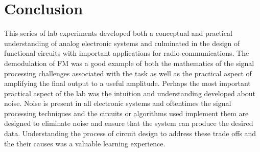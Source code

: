 \documentclass[11pt]{article}
\begin{document}
\section{Conclusion}
  This series of lab experiments developed both a conceptual and practical understanding of analog electronic systems and culminated in the design of functional circuits with important applications for radio communications. The demodulation of FM was a good example of both the mathematics of the signal processing challenges associated with the task as well as the practical aspect of amplifying the final output to a useful amplitude. Perhaps the most important practical aspect of the lab was the intuition and understanding developed about noise. Noise is present in all electronic systems and oftentimes the signal processing techniques and the circuits or algorithms used implement them are designed to eliminate noise and ensure that the system can produce the desired data. Understanding the process of circuit design to address these trade offs and the their causes was a valuable learning experience.
\end{document}
